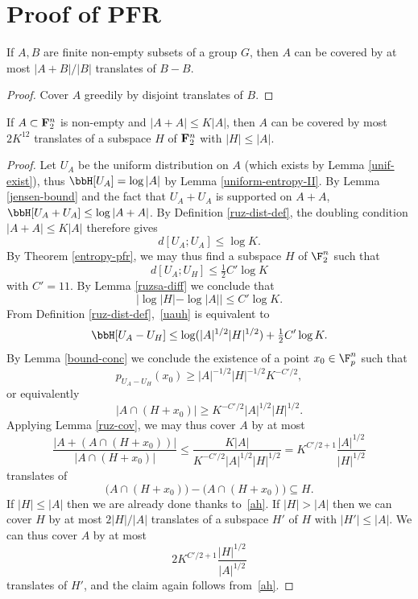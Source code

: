 \chapter{Proof of PFR}

\begin{lemma}
\label{ruz-cov}
\leanok
If $A,B$ are finite non-empty subsets of a group $G$, then $A$ can be covered by at most $|A+B|/|B|$ translates of $B-B$.
\end{lemma}
\begin{proof}
\leanok
Cover $A$ greedily by disjoint translates of $B$.
\end{proof}

\begin{theorem}[PFR]\label{pfr}
\leanok
If $A \subset {\bf F}_2^n$ is non-empty and $|A+A| \leq K|A|$, then $A$ can be covered by most $2K^{12}$ translates of a subspace $H$ of ${\bf F}_2^n$ with $|H| \leq |A|$.
\end{theorem}

\begin{proof}\leanok
  Let $U_A$ be the uniform distribution on $A$ (which exists by Lemma \ref{unif-exist}), thus $\bbH[U_A] = \log |A|$ by Lemma \ref{uniform-entropy-II}. By Lemma \ref{jensen-bound} and the fact that $U_A + U_A$ is supported on $A + A$, $\bbH[U_A + U_A] \leq \log|A+A|$. By Definition \ref{ruz-dist-def}, the doubling condition $|A+A| \leq K|A|$ therefore gives
  \[d[U_A;U_A] \leq \log K.\]
  By Theorem \ref{entropy-pfr}, we may thus find a subspace $H$ of $\F_2^n$ such that
  \begin{equation}\label{uauh} d[U_A;U_H] \leq \tfrac{1}{2} C' \log K\end{equation}
  with $C' = 11$.
  By Lemma \ref{ruzsa-diff} we conclude that
  \begin{equation}\label{ah}
    |\log |H| - \log |A|| \leq C' \log K.
  \end{equation}
  From Definition \ref{ruz-dist-def},~\eqref{uauh} is equivalent to
  \[\bbH[U_A - U_H] \leq \log( |A|^{1/2} |H|^{1/2}) + \tfrac{1}{2} C' \log K.\]
  By Lemma \ref{bound-conc} we conclude the existence of a point $x_0 \in \F_p^n$ such that
  \[p_{U_A-U_H}(x_0) \geq |A|^{-1/2} |H|^{-1/2} K^{-C'/2},\]
  or equivalently
  \[|A \cap (H + x_0)| \geq K^{-C'/2} |A|^{1/2} |H|^{1/2}.\]
  Applying Lemma \ref{ruz-cov}, we may thus cover $A$ by at most
  \[\frac{|A + (A \cap (H+x_0))|}{|A \cap (H + x_0)|} \leq \frac{K|A|}{K^{-C'/2} |A|^{1/2} |H|^{1/2}} = K^{C'/2+1} \frac{|A|^{1/2}}{|H|^{1/2}}\]
  translates of
  \[\bigl(A \cap (H + x_0)\bigr) - \bigl(A \cap (H + x_0)\bigr) \subseteq H.\]
  If $|H| \leq |A|$ then we are already done thanks to~\eqref{ah}.  If $|H| > |A|$ then we can cover $H$ by at most $2 |H|/|A|$ translates of a subspace $H'$ of $H$ with $|H'| \leq |A|$.  We can thus cover $A$ by at most
  \[2K^{C'/2+1} \frac{|H|^{1/2}}{|A|^{1/2}}\]
  translates of $H'$, and the claim again follows from~\eqref{ah}.
\end{proof}

